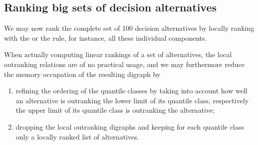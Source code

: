 \documentclass[a4paper,10pt,english]{sphinxhowto}
\begin{document}
\begin{sphinxVerbatim}[commandchars=\\\{\},numbers=left,firstnumber=1,stepnumber=1]
          
               \PYG{p}{[}\PYG{p}{]}\PYG{p}{[}\PYG{p}{]}
                
                  
                  
        
          
          
\end{sphinxVerbatim}


\subsection{Ranking big sets of decision alternatives}
\label{\detokenize{tutorial:ranking-big-sets-of-decision-alternatives}}
We may now rank the complete set of 100 decision alternatives by locally ranking with the  or the  rule, for instance, all these individual components.

\begin{sphinxVerbatim}[commandchars=\\\{\},numbers=left,firstnumber=1,stepnumber=1]
\PYG{g+go}{ [22, 53, 3, 34, 56, 62, 24, 44, 50, 93, 41, 63, 29, 58,}
\PYG{g+go}{  52, 15, 32, 49, 51, 74, 16, 14, 75, 79, 83, 84]}
\end{sphinxVerbatim}

When actually computing linear rankings of a set of alternatives, the local outranking relations are of no practical usage, and we may furthermore reduce the memory occupation of the resulting digraph by
\begin{enumerate}
%
\item {} 
refining the ordering of the quantile classes by taking into account how well an alternative is outranking the lower limit of its quantile class, respectively the upper limit of its quantile class is  outranking the alternative;

\item {} 
dropping the local outranking digraphs and keeping for each quantile class only a locally ranked list of alternatives.

\end{enumerate}
\end{document}
